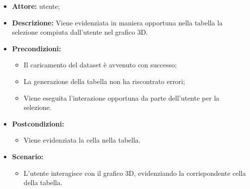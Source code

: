 \begin{itemize}    
    \item \textbf{Attore:} utente;
    \item \textbf{Descrizione:} Viene evidenziata in maniera opportuna nella tabella la selezione compiuta dall'utente nel grafico 3D.
    \item \textbf{Precondizioni:}    
        \begin{itemize}
            \item Il caricamento del dataset è avvenuto con successo;
            \item La generazione della tabella non ha riscontrato errori;
            \item Viene eseguita l'interazione opportuna da parte dell'utente per la selezione.
        \end{itemize}    
    \item \textbf{Postcondizioni:}
        \begin{itemize}
            \item Viene evidenziata la cella nella tabella.
        \end{itemize}    
    \item \textbf{Scenario:} 
        \begin{itemize}
            \item L'utente interagisce con il grafico 3D, evidenziando la corrispondente cella della tabella.
        \end{itemize}
\end{itemize}

\pagebreak

